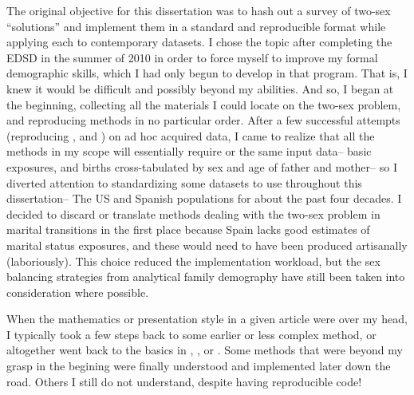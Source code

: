 The original objective for this dissertation was to hash out a survey of two-sex
``solutions'' and implement them in a standard and reproducible format while
applying each to contemporary datasets. I chose the topic after completing the
EDSD in the summer of 2010 in order to force myself to improve my formal
demographic skills, which I had only begun to develop in that program. That
is, I knew it would be difficult and possibly beyond my abilities. And so, I
began at the beginning, collecting all the materials I could locate on the 
two-sex problem, and reproducing methods in no particular order. After a few 
successful attempts (reproducing \citet{schoen1981harmonic},
\citet{mc1975models} and \citet{henry1972nuptiality}) on ad hoc acquired data, I
came to realize that all the methods in my scope will essentially require or
the same input data-- basic exposures, and births cross-tabulated by
sex and age of father and mother-- so I diverted attention to standardizing some
datasets to use throughout this dissertation-- The US and Spanish populations
for about the past four decades. I decided to discard or translate methods
dealing with the two-sex problem in marital transitions in the first place 
because Spain lacks good estimates of marital status exposures, 
and these would need to have been produced artisanally (laboriously). This
choice reduced the implementation workload, but the sex balancing strategies
from analytical family demography have still been taken into consideration where
possible.

When the mathematics or
presentation style in a given article were over my head, I typically took a few
steps back to some earlier or less complex method, or altogether went back to the basics 
in \citet{sharpe1911problem}, \citet{kuczynski1932fertility}, \citet{coale1972growth} 
or \citet{caswell2001matrix}. Some methods that were beyond my grasp in the 
begining \citep[e.g., ][]{mitra1978derivation, gupta1978alternative} were
finally understood and implemented later down the road. Others I still do not 
understand\cite[e.g., ][]{choo2006estimating}, despite having
reproducible code!


